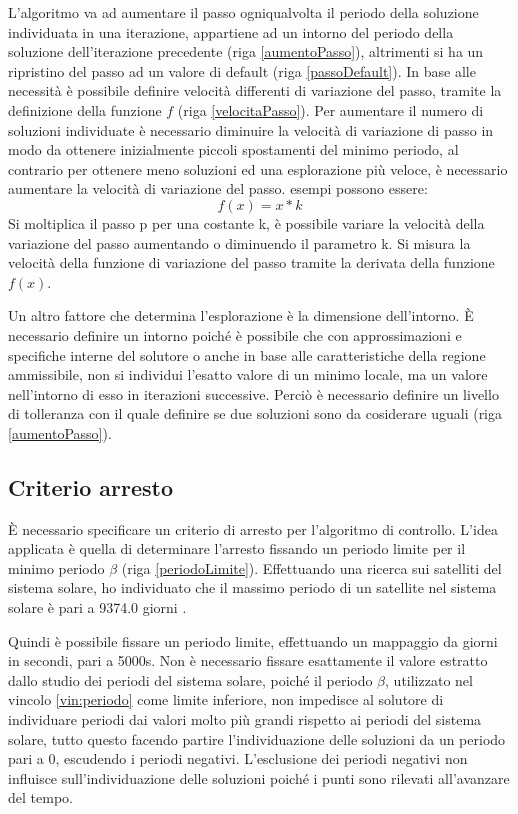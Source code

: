\documentclass[a4paper,12pt]{report}
\begin{document}
L'algoritmo va ad aumentare il passo ogniqualvolta il periodo della soluzione individuata in una iterazione, appartiene ad un intorno del periodo della soluzione dell'iterazione precedente (riga \ref{aumentoPasso}), altrimenti si ha un ripristino del passo ad un valore di default (riga \ref{passoDefault}). In base alle necessità è possibile definire velocità differenti di variazione del passo, tramite la definizione della funzione $f$ (riga \ref{velocitaPasso}). Per aumentare il numero di soluzioni individuate è necessario diminuire la velocità di variazione di passo in modo da ottenere inizialmente piccoli spostamenti del minimo periodo, al contrario per ottenere meno soluzioni ed una esplorazione più veloce, è necessario aumentare la velocità di variazione del passo. esempi possono essere:
\begin{equation}
  \label{velocitaPassoEspl}
f(x) = x * k
\end{equation}
Si moltiplica il passo p per una costante k, è possibile variare la velocità della variazione del passo aumentando o diminuendo il parametro k. Si misura la velocità della funzione di variazione del passo tramite la derivata della funzione $f(x)$.

Un altro fattore che determina l'esplorazione è la dimensione dell'intorno. È necessario definire un intorno poiché è possibile che con approssimazioni e specifiche interne del solutore o anche in base alle caratteristiche della regione ammissibile, non si individui l'esatto valore di un minimo locale, ma un valore nell'intorno di esso in iterazioni successive. Perciò è necessario definire un livello di tolleranza con il quale definire se due soluzioni sono da cosiderare uguali (riga \ref{aumentoPasso}).
\subsection{Criterio arresto }
\label{ss:arresto}
È necessario specificare un criterio di arresto per l'algoritmo di controllo. L'idea applicata è quella di determinare l'arresto fissando un periodo limite per il minimo periodo $ \beta $ (riga \ref{periodoLimite}). Effettuando una ricerca sui satelliti del sistema solare, ho individuato che il massimo periodo di un satellite nel sistema solare è pari a 9374.0 giorni \cite{nasa}.

Quindi è possibile fissare un periodo limite, effettuando un mappaggio da giorni in secondi, pari a 5000s.
Non è necessario fissare esattamente il valore estratto dallo studio dei periodi del sistema solare, poiché il periodo $ \beta $, utilizzato nel vincolo \eqref{vin:periodo}  come limite inferiore, non impedisce al solutore di individuare periodi dai valori molto più grandi rispetto ai periodi del sistema solare, tutto questo facendo partire l'individuazione delle soluzioni da un periodo pari a 0, escudendo i periodi negativi. L'esclusione dei periodi negativi non influisce sull'individuazione delle soluzioni poiché i punti sono rilevati all'avanzare del tempo.
\end{document}
